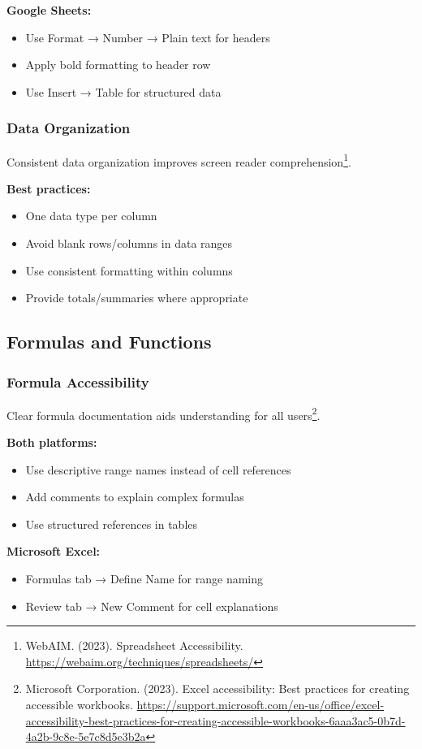 \textbf{Google Sheets:}
\begin{itemize}
\item Use Format → Number → Plain text for headers
\item Apply bold formatting to header row
\item Use Insert → Table for structured data
\end{itemize}

\subsubsection{Data Organization}
Consistent data organization improves screen reader comprehension\footnote{WebAIM. (2023). Spreadsheet Accessibility. \url{https://webaim.org/techniques/spreadsheets/}}.

\textbf{Best practices:}
\begin{itemize}
\item One data type per column
\item Avoid blank rows/columns in data ranges
\item Use consistent formatting within columns
\item Provide totals/summaries where appropriate
\end{itemize}

\subsection{Formulas and Functions}

\subsubsection{Formula Accessibility}
Clear formula documentation aids understanding for all users\footnote{Microsoft Corporation. (2023). Excel accessibility: Best practices for creating accessible workbooks. \url{https://support.microsoft.com/en-us/office/excel-accessibility-best-practices-for-creating-accessible-workbooks-6aaa3ac5-0b7d-4a2b-9c8e-5e7c8d5e3b2a}}.

\textbf{Both platforms:}
\begin{itemize}
\item Use descriptive range names instead of cell references
\item Add comments to explain complex formulas
\item Use structured references in tables
\end{itemize}

\textbf{Microsoft Excel:}
\begin{itemize}
\item Formulas tab → Define Name for range naming
\item Review tab → New Comment for cell explanations
\end{itemize}


